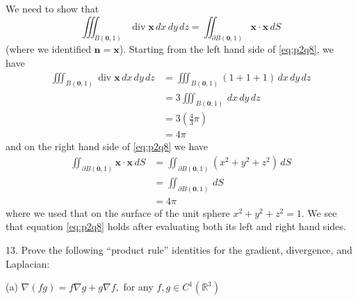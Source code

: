 \documentclass{article}
\begin{document}
We need to show that
%
\begin{equation}
    \iiint_{B(\mathbf{0}, 1)} \operatorname{div} \mathbf{x} \,dx \,dy \,dz = \iint_{\partial B(\mathbf{0}, 1)} \mathbf{x} \cdot \mathbf{x} \,dS
    \label{eq:p2q8}
\end{equation}
%
(where we identified $\mathbf{n} = \mathbf{x}$). Starting from the left
hand side of \eqref{eq:p2q8}, we have
%
\begin{align*}
    \iiint_{B(\mathbf{0}, 1)} \operatorname{div} \mathbf{x} \,dx \,dy \,dz
        &= \iiint_{B(\mathbf{0}, 1)} (1 + 1 + 1) \,dx \,dy \,dz \\
        &= 3 \iiint_{B(\mathbf{0}, 1)} \,dx \,dy \,dz \\
        &= 3 \left( \frac{4}{3} \pi \right)\\
        &= 4 \pi
\end{align*}
%
and on the right hand side of \eqref{eq:p2q8} we have
%
\begin{align*}
    \iint_{\partial B(\mathbf{0}, 1)} \mathbf{x} \cdot \mathbf{x} \,dS
        &= \iint_{\partial B(\mathbf{0}, 1)} (x^2 + y^2 + z^2) \,dS \\
        &= \iint_{\partial B(\mathbf{0}, 1)} \,dS \\
        &= 4 \pi
\end{align*}
%
where we used that on the surface of the unit sphere $x^2 + y^2 + z^2 =
1$. We see that equation \eqref{eq:p2q8} holds after evaluating both its
left and right hand sides.

\vspace{5mm}
13. Prove the following ``product rule'' identities for the gradient,
divergence, and Laplacian:

(a) $\nabla(f g) = f \nabla g + g \nabla f,$ for any
$f, g \in C^{1}\left(\mathbb{R}^{3}\right)$
\end{document}
